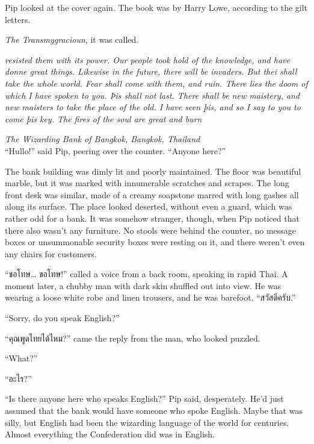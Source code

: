 Pip looked at the cover again. The book was by Harry Lowe, according to
the gilt letters.

\emph{The Transmygracioun}, it was called.

\mybreak

\emph{resisted them with its power. Our people took hold of the
knowledge, and have donne great things. Likewise in the future, there
will be invaders. But thei shall take the whole world. Fear shall come
with them, and ruin. There lies the doom of which I have spoken to you.
Þis shall not last. There shall be new maistery, and new maisters to
take the place of the old. I have seen þis, and so I say to you to come
þis key. The fires of the soul are great and burn}

\mybreak

\emph{The Wizarding Bank of Bangkok, Bangkok, Thailand}\\

``Hullo!'' said Pip, peering over the counter. ``Anyone here?''

The bank building was dimly lit and poorly maintained. The floor was
beautiful marble, but it was marked with innumerable scratches and
scrapes. The long front desk was similar, made of a creamy soapstone
marred with long gashes all along its surface. The place looked
deserted, without even a guard, which was rather odd for a bank. It was
somehow stranger, though, when Pip noticed that there also wasn't any
furniture. No stools were behind the counter, no message boxes or
unsummonable security boxes were resting on it, and there weren't even
any chairs for customers.

``\foreignlanguage{thai}{ขอโทษ\ldots{} ขอโทษ}!'' called a voice from a
back room, speaking in rapid Thai. A moment later, a chubby man with
dark skin shuffled out into view. He was wearing a loose white robe and
linen trousers, and he was barefoot.
``\foreignlanguage{thai}{สวัสดีครับ}.''

``Sorry, do you speak English?''

``\foreignlanguage{thai}{คุณพูดไทยได้ไหม}?'' came the reply from the
man, who looked puzzled.

``What?''

``\foreignlanguage{thai}{อะไร}?''

``Is there anyone here who speaks English?'' Pip said, desperately. He'd
just assumed that the bank would have someone who spoke English. Maybe
that was silly, but English had been the wizarding language of the world
for centuries. Almost everything the Confederation did was in English.

